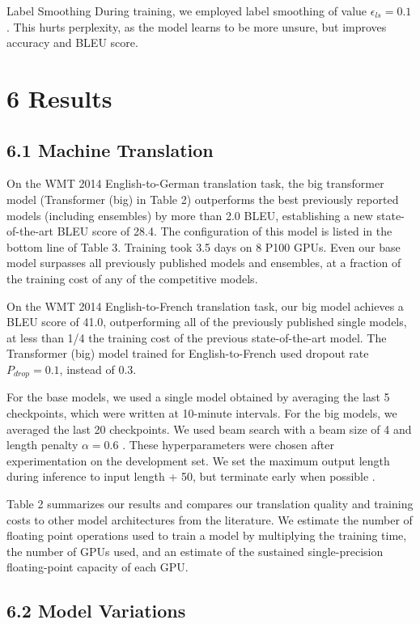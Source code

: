\documentclass[conference]{IEEEtran}
\begin{document}
Label Smoothing During training, we employed label smoothing of value $\epsilon_{ls} = 0.1$ \cite{ref36}. This hurts perplexity, as the model learns to be more unsure, but improves accuracy and BLEU score.

\section{6 Results}

\subsection{6.1 Machine Translation}

On the WMT 2014 English-to-German translation task, the big transformer model (Transformer (big) in Table 2) outperforms the best previously reported models (including ensembles) by more than 2.0 BLEU, establishing a new state-of-the-art BLEU score of 28.4. The configuration of this model is listed in the bottom line of Table 3. Training took 3.5 days on 8 P100 GPUs. Even our base model surpasses all previously published models and ensembles, at a fraction of the training cost of any of the competitive models.

On the WMT 2014 English-to-French translation task, our big model achieves a BLEU score of 41.0, outperforming all of the previously published single models, at less than 1/4 the training cost of the previous state-of-the-art model. The Transformer (big) model trained for English-to-French used dropout rate $P_{drop} = 0.1$, instead of 0.3.

For the base models, we used a single model obtained by averaging the last 5 checkpoints, which were written at 10-minute intervals. For the big models, we averaged the last 20 checkpoints. We used beam search with a beam size of 4 and length penalty $\alpha = 0.6$ \cite{ref38}. These hyperparameters were chosen after experimentation on the development set. We set the maximum output length during inference to input length + 50, but terminate early when possible \cite{ref38}.

Table 2 summarizes our results and compares our translation quality and training costs to other model architectures from the literature. We estimate the number of floating point operations used to train a model by multiplying the training time, the number of GPUs used, and an estimate of the sustained single-precision floating-point capacity of each GPU.

\subsection{6.2 Model Variations}
\end{document}
